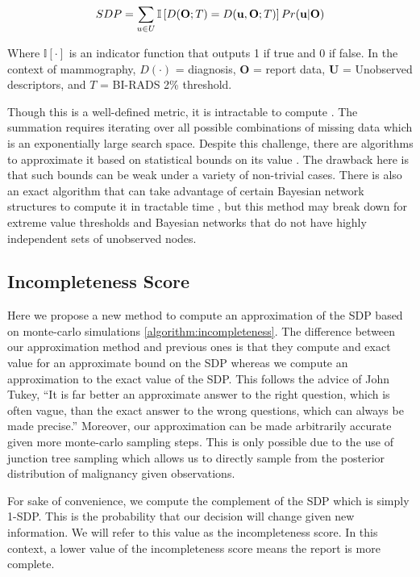 \begin{equation}
\Large
SDP = \sum_{u \in U}\mathbb{I}\left[D(\mathbf{O};T) = D(\mathbf{u},\mathbf{O};T)\right]Pr(\mathbf{u}|\mathbf{O})
\end{equation}

Where $\mathbb{I}[\cdotp]$ is an indicator function that outputs 1 if true and 0 if false. 
In the context of mammography, $D(\cdotp)$ = diagnosis, $\mathbf{O}$ = report data, $\mathbf{U}$ = Unobserved descriptors, and $T$ = BI-RADS 2\% threshold.

Though this is a well-defined metric, it is intractable to compute \cite{Chen:2013tw}. The summation requires iterating over all possible combinations of missing data which is an exponentially large search space. Despite this challenge, there are algorithms to approximate it based on statistical bounds on its value \cite{Choi:2012id}. The drawback here is that such bounds can be weak under a variety of non-trivial cases. There is also an exact algorithm that can take advantage of certain Bayesian network structures to compute it in tractable time \cite{Chen:2013tw}, but this method may break down for extreme value thresholds and Bayesian networks that do not have highly independent sets of unobserved nodes.

\subsection{Incompleteness Score}
Here we propose a new method to compute an approximation of the SDP based on monte-carlo simulations \ref{algorithm:incompleteness}. The difference between our approximation method and previous ones\cite{Choi:2012id} is that they compute and exact value for an approximate bound on the SDP whereas we compute an approximation to the exact value of the SDP. This follows the advice of John Tukey, “It is far better an approximate answer to the right question, which is often vague, than the exact answer to the wrong questions, which can always be made precise.” \cite{Tukey:1962vw} Moreover, our approximation can be made arbitrarily accurate given more monte-carlo sampling steps. This is only possible due to the use of junction tree sampling which allows us to directly sample from the posterior distribution of malignancy given observations.

For sake of convenience, we compute the complement of the SDP which is simply 1-SDP. This is the probability that our decision will change given new information. We will refer to this value as the incompleteness score. In this context, a lower value of the incompleteness score means the report is more complete.


